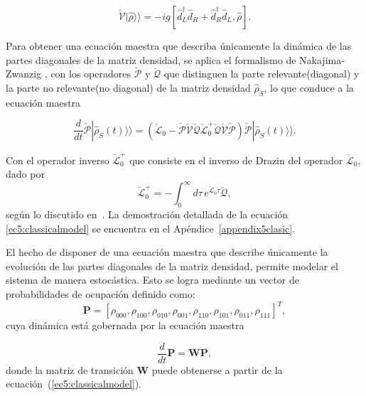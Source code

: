 \begin{equation*}
\check{\mathcal{V}}|\hat{\rho}\rangle\rangle = -ig[\hat{d}_{L}^{\dagger} \hat{d}_{R} + \hat{d}_{R}^{\dagger} \hat{d}_{L}, \hat{\rho}].
\end{equation*}

Para obtener una ecuación maestra que describa únicamente la dinámica de las partes diagonales de la matriz densidad, se aplica el formalismo de Nakajima-Zwanzig \cite{zwanzig1966statistical}, con los operadores $\check{\mathcal{P}}$ y $\check{\mathcal{Q}}$ que distinguen la parte relevante(diagonal) y la parte no relevante(no diagonal) de la matriz densidad $\hat{\rho}_{S}$, lo que conduce a la ecuación maestra

\begin{equation}
    \frac{d}{dt}\check{\mathcal{P}}|\hat{\rho}_{S}(t)\rangle \rangle = (\check{\mathcal{L}}_{0} - \check{\mathcal{P}}\check{\mathcal{V}}\check{\mathcal{Q}}\check{\mathcal{L}}^{+}_{0}\check{\mathcal{Q}}\check{\mathcal{V}}\check{\mathcal{P}})\check{\mathcal{P}}|\hat{\rho}_{S}(t)\rangle \rangle. 
\label{ec5:classicalmodel}
\end{equation}

Con el operador inverso $\check{\mathcal{L}}_{0}^{+}$ que consiste en el inverso de Drazin del operador $\check{\mathcal{L}}_{0}$, dado por 
\begin{equation*}
\check{\mathcal{L}}_{0}^{+} = -\int_{0}^{\infty} d\tau\, e^{\check{\mathcal{L}}_{0} \tau} \check{\mathcal{Q}},
\end{equation*}
según lo discutido en~\cite{landi2024current}. La demostración detallada de la ecuación \ref{ec5:classicalmodel} se encuentra en el Apéndice~\ref{appendix5clasic}.

El hecho de disponer de una ecuación maestra que describe únicamente la evolución de las partes diagonales de la matriz densidad, permite modelar el sistema de manera estocástica. Esto se logra mediante un vector de probabilidades de ocupación definido como:
\begin{equation*}
\mathbf{P} = [\rho_{000}, \rho_{100}, \rho_{010}, \rho_{001}, \rho_{110}, \rho_{101}, \rho_{011}, \rho_{111}]^{T},
\end{equation*}
cuya dinámica está gobernada por la ecuación maestra

\begin{equation}
    \frac{d}{dt}\textbf{P} = \textbf{W}\textbf{P},
    \label{sec5:classicsemi}
\end{equation}
donde la matriz de transición $\mathbf{W}$ puede obtenerse a partir de la ecuación~(\ref{ec5:classicalmodel}).

